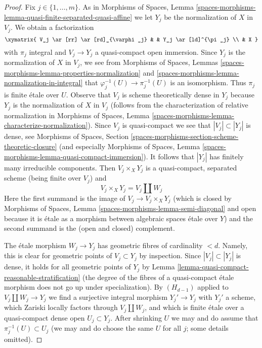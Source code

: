 \begin{proof}
\medskip\noindent
Fix $j \in \{1, \ldots, m\}$.
As in Morphisms of Spaces, Lemma
\ref{spaces-morphisms-lemma-quasi-finite-separated-quasi-affine}
we let $Y_j$ be the normalization of $X$ in $V_j$. We obtain a factorization
$$
\xymatrix{
V_j \ar[rr] \ar[rd]_{\varphi_j} & & Y_j \ar[ld]^{\pi_j} \\
& X
}
$$
with $\pi_j$ integral and $V_j \to Y_j$ a quasi-compact open immersion. Since
$Y_j$ is the normalization of $X$ in $V_j$, we see from
Morphisms of Spaces, Lemmas
\ref{spaces-morphisms-lemma-properties-normalization} and
\ref{spaces-morphisms-lemma-normalization-in-integral}
that $\varphi_j^{-1}(U) \to \pi_j^{-1}(U)$ is an isomorphism.
Thus $\pi_j$ is finite \'etale over $U$. Observe that $V_j$
is scheme theoretically dense in $Y_j$ because $Y_j$ is the normalization
of $X$ in $V_j$ (follows from the characterization of relative normalization
in Morphisms of Spaces, Lemma
\ref{spaces-morphisms-lemma-characterize-normalization}). Since $V_j$
is quasi-compact we see that $|V_j| \subset |Y_j|$ is dense,
see Morphisms of Spaces, Section
\ref{spaces-morphisms-section-scheme-theoretic-closure}
(and especially Morphisms of Spaces, Lemma
\ref{spaces-morphisms-lemma-quasi-compact-immersion}).
It follows that $|Y_j|$ has finitely many irreducible components.
Then $V_j \times_X Y_j$ is a quasi-compact, separated scheme
(being finite over $V_j$) and
$$
V_j \times_X Y_j = V_j \amalg W_j
$$
Here the first summand is the image of $V_j \to V_j \times_X Y_j$
(which is closed by
Morphisms of Spaces, Lemma \ref{spaces-morphisms-lemma-semi-diagonal}
and open because it is \'etale as a morphism between
algebraic spaces \'etale over $Y$) and
the second summand is the (open and closed) complement.

\medskip\noindent
The \'etale morphism $W_j \to Y_j$ has geometric fibres of cardinality $< d$.
Namely, this is clear for geometric points of $V_j \subset Y_j$ by inspection.
Since $|V_j| \subset |Y_j|$ is dense, it holds for all geometric points
of $Y_j$ by Lemma \ref{lemma-quasi-compact-reasonable-stratification}
(the degree of the fibres of a quasi-compact \'etale morphism
does not go up under specialization). By $(H_{d - 1})$ applied
to $V_j \amalg W_j \to Y_j$ we find a surjective integral morphism
$Y_j' \to Y_j$ with $Y_j'$ a scheme, which Zariski locally factors
through $V_j \amalg W_j$, and which is finite \'etale over a
quasi-compact dense open $U_j \subset Y_j$. After shrinking $U$
we may and do assume that $\pi_j^{-1}(U) \subset U_j$
(we may and do choose the same $U$ for all $j$; some details omitted).


\end{proof}
